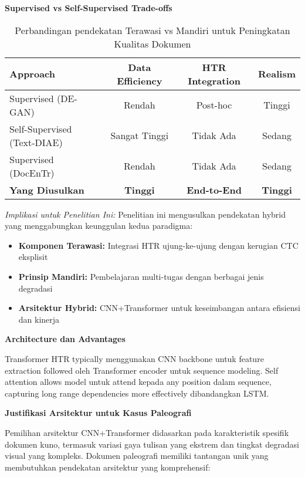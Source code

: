 \documentclass[12pt,a4paper]{article}
\begin{document}
\textbf{Supervised vs Self-Supervised Trade-offs}

\begin{table}[H]
\centering
\caption{Perbandingan pendekatan Terawasi vs Mandiri untuk Peningkatan Kualitas Dokumen}
\label{tab:supervised-selfsupervised}
\footnotesize
\begin{tabular}{|l|c|c|c|}
\hline
\textbf{Approach} & \textbf{Data Efficiency} & \textbf{HTR Integration} & \textbf{Realism} \\ \hline
Supervised (DE-GAN) & Rendah & Post-hoc & Tinggi \\ \hline
Self-Supervised (Text-DIAE) & Sangat Tinggi & Tidak Ada & Sedang \\ \hline
Supervised (DocEnTr) & Rendah & Tidak Ada & Sedang \\ \hline
\textbf{Yang Diusulkan} & \textbf{Tinggi} & \textbf{End-to-End} & \textbf{Tinggi} \\ \hline
\end{tabular}
\end{table}

\textit{Implikasi untuk Penelitian Ini:} Penelitian ini mengusulkan pendekatan hybrid yang menggabungkan keunggulan kedua paradigma:
\begin{itemize}
    \item \textbf{Komponen Terawasi:} Integrasi HTR ujung-ke-ujung dengan kerugian CTC eksplisit
    \item \textbf{Prinsip Mandiri:} Pembelajaran multi-tugas dengan berbagai jenis degradasi
    \item \textbf{Arsitektur Hybrid:} CNN+Transformer untuk keseimbangan antara efisiensi dan kinerja
\end{itemize}

\textbf{Architecture dan Advantages}

Transformer HTR typically menggunakan CNN backbone untuk feature extraction followed oleh Transformer encoder untuk sequence modeling. Self attention allows model untuk attend kepada any position dalam sequence, capturing long range dependencies more effectively dibandangkan LSTM.

\textbf{Justifikasi Arsitektur untuk Kasus Paleografi}

Pemilihan arsitektur CNN+Transformer didasarkan pada karakteristik spesifik dokumen kuno, termasuk variasi gaya tulisan yang ekstrem dan tingkat degradasi visual yang kompleks. Dokumen paleografi memiliki tantangan unik yang membutuhkan pendekatan arsitektur yang komprehensif:
\end{document}
